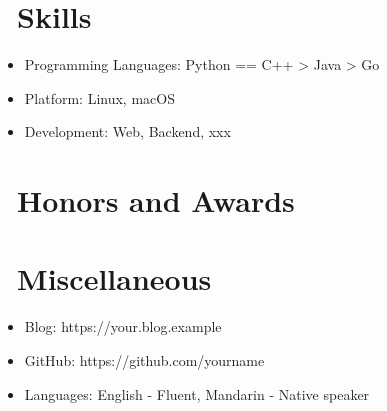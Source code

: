 \documentclass{resume}
\begin{document}
\section{\faCogs\ Skills}
\begin{itemize}[parsep=0.5ex]
  \item Programming Languages: Python == C++ > Java > Go
  \item Platform: Linux, macOS
  \item Development: Web, Backend, xxx
\end{itemize}

\section{\faHeartO\ Honors and Awards}

\section{\faInfo\ Miscellaneous}
\begin{itemize}[parsep=0.5ex]
  \item Blog: https://your.blog.example
  \item GitHub: https://github.com/yourname
  \item Languages: English - Fluent, Mandarin - Native speaker
\end{itemize}

%
%
\end{document}
